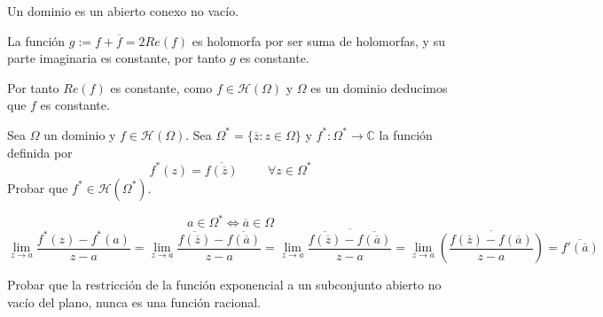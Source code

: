 \begin{sol}
	
Un dominio es un abierto conexo no vacío.

La función $g := f+\overline{f} = 2Re(f)$ es holomorfa por ser suma de holomorfas, y su parte imaginaria es constante, por tanto $g$ es constante.

Por tanto $Re(f)$ es constante, como $f\in\mathcal{H}(\Omega)$ y $ \Omega$ es un dominio deducimos que $f$ es constante.
\end{sol}





\begin{ejer}
	Sea $\Omega$ un dominio y $f\in\mathcal{H}(\Omega)$. Sea $\Omega^{\ast} = \{ \overline{z} : z\in\Omega \}$ y $f^{\ast}:\Omega^{\ast} \rightarrow \mathbb{C}$ la función definida por
	$$ f^{\ast}(z) = \overline{ f(\overline{z} ) } \hspace{1cm} \forall z\in\Omega^{\ast}$$
	Probar que $f^{\ast}\in\mathcal{H}(\Omega^{\ast})$.
\end{ejer}

\begin{sol}
	
\begin{comment}
Tenemos que 
$P(z) = a_n z^n + a_{n-1}z^{n-1}+...+a_1z + a_0$, 
$P(\overline{z}) = a_n \overline{z}^n + a_{n-1}\overline{z}^{n-1}+...+a_1\overline{z} + a_0 $

$\overline{ P(\overline{z}) } = \overline{a_n}z^n + \overline{a_{n-1}}z^{n-1}+...+\overline{a_1}z + \overline{a_0}$

$\overline{z}^n = \overline{z} ... \overline{z} = \overline{(z^n)}$

resolvemos
\end{comment}
$$a\in\Omega^{\ast} \Longleftrightarrow \overline{a}\in\Omega$$
$$\lim_{z\rightarrow a} \frac{f^{\ast}(z)-f^{\ast}(a)}{z-a} = \lim_{z\rightarrow a} \frac{\overline{f(\overline{z})} - \overline{f(\overline{a})}}{z-a} =
\lim_{z\rightarrow a} \frac{\overline{\overline{f(\overline{z})} - \overline{f(\overline{a})}}}{z-a} =
\lim_{z\rightarrow a} \overline{\left( \frac{f(\overline{z})-f(\overline{a})}{z-a} \right)} =
 \overline{f'(\overline{a})}$$
\end{sol}




\begin{ejer}
	Probar que la restricción de la función exponencial a un subconjunto abierto no vacío del plano, nunca es una función racional. %
\end{ejer}

